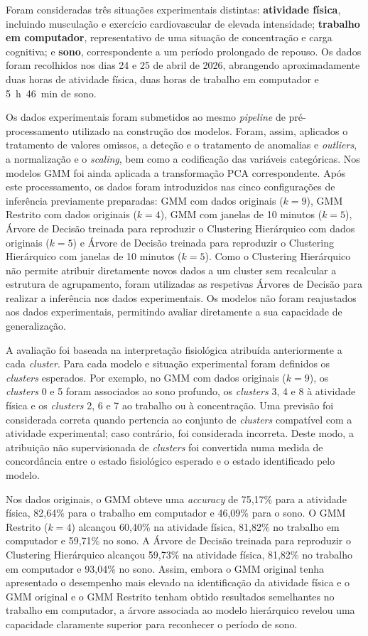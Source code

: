 Foram consideradas três situações experimentais distintas: \textbf{atividade física}, incluindo musculação e exercício cardiovascular de elevada intensidade; \textbf{trabalho em computador}, representativo de uma situação de concentração e carga cognitiva; e \textbf{sono}, correspondente a um período prolongado de repouso. Os dados foram recolhidos nos dias 24 e 25 de abril de 2026, abrangendo aproximadamente duas horas de atividade física, duas horas de trabalho em computador e 5~h~46~min de sono.

Os dados experimentais foram submetidos ao mesmo \textit{pipeline} de pré-processamento utilizado na construção dos modelos. Foram, assim, aplicados o tratamento de valores omissos, a deteção e o tratamento de anomalias e \textit{outliers}, a normalização e o \textit{scaling}, bem como a codificação das variáveis categóricas. Nos modelos GMM foi ainda aplicada a transformação PCA correspondente. Após este processamento, os dados foram introduzidos nas cinco configurações de inferência previamente preparadas: GMM com dados originais ($k=9$), GMM Restrito com dados originais ($k=4$), GMM com janelas de 10 minutos ($k=5$), Árvore de Decisão treinada para reproduzir o Clustering Hierárquico com dados originais ($k=5$) e Árvore de Decisão treinada para reproduzir o Clustering Hierárquico com janelas de 10 minutos ($k=5$). Como o Clustering Hierárquico não permite atribuir diretamente novos dados a um cluster sem recalcular a estrutura de agrupamento, foram utilizadas as respetivas Árvores de Decisão para realizar a inferência nos dados experimentais. Os modelos não foram reajustados aos dados experimentais, permitindo avaliar diretamente a sua capacidade de generalização.

A avaliação foi baseada na interpretação fisiológica atribuída anteriormente a cada \textit{cluster}. Para cada modelo e situação experimental foram definidos os \textit{clusters} esperados. Por exemplo, no GMM com dados originais ($k=9$), os \textit{clusters} 0 e 5 foram associados ao sono profundo, os \textit{clusters} 3, 4 e 8 à atividade física e os \textit{clusters} 2, 6 e 7 ao trabalho ou à concentração. Uma previsão foi considerada correta quando pertencia ao conjunto de \textit{clusters} compatível com a atividade experimental; caso contrário, foi considerada incorreta. Deste modo, a atribuição não supervisionada de \textit{clusters} foi convertida numa medida de concordância entre o estado fisiológico esperado e o estado identificado pelo modelo.

Nos dados originais, o GMM obteve uma \textit{accuracy} de 75,17\% para a atividade física, 82,64\% para o trabalho em computador e 46,09\% para o sono. O GMM Restrito ($k=4$) alcançou 60,40\% na atividade física, 81,82\% no trabalho em computador e 59,71\% no sono. A Árvore de Decisão treinada para reproduzir o Clustering Hierárquico alcançou 59,73\% na atividade física, 81,82\% no trabalho em computador e 93,04\% no sono. Assim, embora o GMM original tenha apresentado o desempenho mais elevado na identificação da atividade física e o GMM original e o GMM Restrito tenham obtido resultados semelhantes no trabalho em computador, a árvore associada ao modelo hierárquico revelou uma capacidade claramente superior para reconhecer o período de sono.

